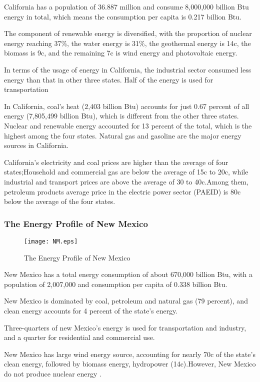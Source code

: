 California has a population of 36.887 million and  consume 8,000,000 billion Btu energy in total, which means the consumption per capita is 0.217 billion Btu. 


The component of renewable energy is diversified, with the proportion of nuclear energy reaching 37\%, the water energy is 31\%, the geothermal energy is 14c, the biomass is 9c, and the remaining 7c is wind energy and photovoltaic energy. 


In terms of the usage of energy in California, the industrial sector consumed less energy than that in other three states. Half of the energy is used for transportation

In California, coal's heat (2,403 billion Btu) accounts for just 0.67 percent of all energy  (7,805,499 billion Btu), which is different from the other three states. Nuclear and renewable energy accounted for 13 percent of the total, which is the highest among the four states. Natural gas and gasoline are the major energy sources in California. 


California's electricity and coal prices are higher than the average of four states;Household and commercial gas are below the average of 15c to 20c, while industrial and transport prices are above the average of 30 to 40c.Among them,  petroleum products average price in the electric power sector (PAEID) is 80c below the average of the four states.


\newpage
\subsubsection{The Energy Profile of New Mexico}

\begin{figure}[h]

\centering
\texttt{[image: NM.eps]}
\caption{The Energy Profile of New Mexico} \label{fig:aa}
\end{figure}

New Mexico has a total energy consumption of about 670,000 billion Btu, with a population of 2,007,000 and consumption per capita of 0.338 billion Btu.


 New Mexico is dominated by coal, petroleum and natural gas (79 percent), and clean energy accounts for 4 percent of the state's energy. 
 
 
 Three-quarters of new Mexico's energy is used for transportation and industry, and a quarter for residential and commercial use.
 
 
  New Mexico has large wind energy source, accounting for nearly 70c of the state's clean energy, followed by biomass energy, hydropower (14c).However, New Mexico do not produce nuclear energy .
 
